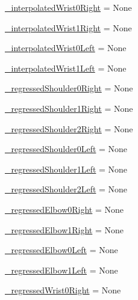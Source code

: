 \begin{DoxyCompactItemize}
\item 
\mbox{\hyperlink{namespacesteering__simulation_aaec0a977fbc1c9147a917be325f3a411}{\+\_\+interpolated\+Wrist0\+Right}} = None
\item 
\mbox{\hyperlink{namespacesteering__simulation_a348d2aedeba474cdc52c04f6920c8d2b}{\+\_\+interpolated\+Wrist1\+Right}} = None
\item 
\mbox{\hyperlink{namespacesteering__simulation_a89100082be780423ef8cb32970fb1719}{\+\_\+interpolated\+Wrist0\+Left}} = None
\item 
\mbox{\hyperlink{namespacesteering__simulation_a044a88f1d8e7442e56c31647186fd626}{\+\_\+interpolated\+Wrist1\+Left}} = None
\item 
\mbox{\hyperlink{namespacesteering__simulation_a9c00f2252bbdc56a767e0dd14244a172}{\+\_\+regressed\+Shoulder0\+Right}} = None
\item 
\mbox{\hyperlink{namespacesteering__simulation_a31e0576d19447bee4b24729459ff4b94}{\+\_\+regressed\+Shoulder1\+Right}} = None
\item 
\mbox{\hyperlink{namespacesteering__simulation_aeec070bce57c67b666f5ebdbae1e27de}{\+\_\+regressed\+Shoulder2\+Right}} = None
\item 
\mbox{\hyperlink{namespacesteering__simulation_a4203655e78045f63c997316cc5c351e4}{\+\_\+regressed\+Shoulder0\+Left}} = None
\item 
\mbox{\hyperlink{namespacesteering__simulation_a7c1b938e9f72b1f50694edd164cb8419}{\+\_\+regressed\+Shoulder1\+Left}} = None
\item 
\mbox{\hyperlink{namespacesteering__simulation_a421efc578e81ec549903721c34847cd8}{\+\_\+regressed\+Shoulder2\+Left}} = None
\item 
\mbox{\hyperlink{namespacesteering__simulation_a9051de1d3ca856247286471428f4904a}{\+\_\+regressed\+Elbow0\+Right}} = None
\item 
\mbox{\hyperlink{namespacesteering__simulation_a8a1973e968c7a7cd522fa01b6bdcc708}{\+\_\+regressed\+Elbow1\+Right}} = None
\item 
\mbox{\hyperlink{namespacesteering__simulation_a6578ba913df0e70ad8bac370b2487690}{\+\_\+regressed\+Elbow0\+Left}} = None
\item 
\mbox{\hyperlink{namespacesteering__simulation_a9abb832a963446f645e9e2ef1c27c7bd}{\+\_\+regressed\+Elbow1\+Left}} = None
\item 
\mbox{\hyperlink{namespacesteering__simulation_a1c654b15f1b8ea91b2997bd5de4f8b9d}{\+\_\+regressed\+Wrist0\+Right}} = None
\item 

\end{DoxyCompactItemize}
